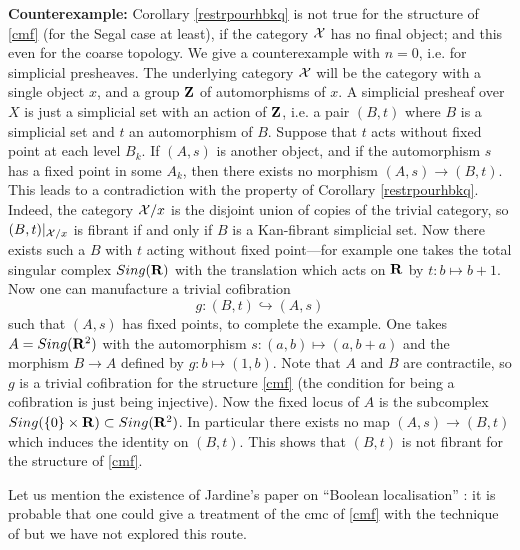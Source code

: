 {\bf Counterexample:} Corollary \ref{restrpourhbkq} is not true for the
structure of \ref{cmf} (for the Segal case at least),
if the category ${\cal X}$ has no final object; and this
even for the coarse topology. We give a counterexample with $n=0$,
i.e. for simplicial presheaves. The underlying category ${\cal X}$
will be the
category with a single object $x$, and a group ${\bf Z}$ of automorphisms of
$x$. A simplicial presheaf over $X$ is just a simplicial
set with an action of ${\bf Z}$, i.e. a pair $(B,t)$ where $B$ is a simplicial
set and $t$ an automorphism of $B$. Suppose that $t$ acts without
fixed point at each level $B_k$. If $(A,s)$ is another object, and if
the automorphism $s$ has a fixed point in some $A_k$, then there exists no
morphism $(A,s)\rightarrow (B,t)$. This leads to a contradiction with
the property of Corollary \ref{restrpourhbkq}. Indeed,
the category ${\cal X} /x$ is the disjoint union of copies of the
trivial category,
so $(B,t)|_{{\cal X} /x}$ is fibrant if and only if $B$ is a Kan-fibrant
simplicial set. Now there exists such a $B$
with $t$ acting without
fixed point---for example one takes the total singular complex $Sing({\bf R} )$
with the translation which acts on ${\bf R}$ by $t: b\mapsto b+1$. Now one can
manufacture a trivial cofibration
$$
g:(B,t)\hookrightarrow (A,s)
$$
such that $(A,s)$ has fixed points, to complete the example. One takes
$A=Sing ({\bf R} ^2)$ with the automorphism $s: (a,b)\mapsto (a,b+a)$ and the
morphism
$B\rightarrow A$ defined by $g:b\mapsto (1,b)$. Note that $A$ and $B$ are
contractile, so $g$ is a trivial cofibration for the structure \ref{cmf}
(the condition for being a cofibration is just being injective).
Now the fixed locus of $A$ is the subcomplex $Sing(\{ 0\} \times {\bf R}
)\subset Sing
({\bf R} ^2)$. In particular there exists no map $(A,s)\rightarrow (B,t)$
which induces the identity on $(B,t)$. This shows that $(B,t)$ is not fibrant
for the structure of \ref{cmf}.


Let us mention the existence of Jardine's paper on
``Boolean localisation'' \cite{JardineBool}: it is probable that one could
give a treatment of the cmc of \ref{cmf} with the technique of
\cite{JardineBool} but we have not explored this route.

